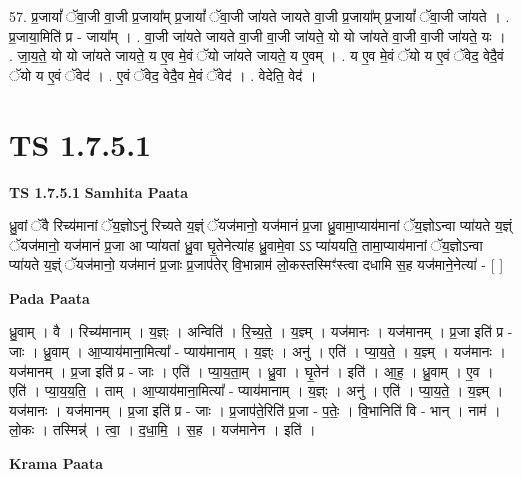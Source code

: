 \documentclass[17pt]{extarticle}
\begin{document}
57. प्र॒जायां᳚ ॅवा॒जी वा॒जी प्र॒जाया᳚म् प्र॒जायां᳚ ॅवा॒जी जा॑यते जायते वा॒जी प्र॒जाया᳚म् प्र॒जायां᳚ ॅवा॒जी जा॑यते । . प्र॒जाया॒मिति॑ प्र - जाया᳚म् । . वा॒जी जा॑यते जायते वा॒जी वा॒जी जा॑यते॒ यो यो जा॑यते वा॒जी वा॒जी जा॑यते॒ यः । . जा॒य॒ते॒ यो यो जा॑यते जायते॒ य ए॒व मे॒वं ॅयो जा॑यते जायते॒ य ए॒वम् । . य ए॒व मे॒वं ॅयो य ए॒वं ॅवेद॒ वेदै॒वं ॅयो य ए॒वं ॅवेद॑ । . ए॒वं ॅवेद॒ वेदै॒व मे॒वं ॅवेद॑ । . वेदेति॒ वेद॑ । \newline
\pagebreak
{}
\section*{ TS 1.7.5.1 }

\textbf{TS 1.7.5.1 } \newline
\textbf{Samhita Paata} \newline

ध्रु॒वां ॅवै रिच्य॑मानां ॅय॒ज्ञोऽनु॑ रिच्यते य॒ज्ञ्ं ॅयज॑मानो॒ यज॑मानं प्र॒जा ध्रु॒वामा॒प्याय॑मानां ॅय॒ज्ञोऽन्वा प्या॑यते य॒ज्ञ्ं ॅयज॑मानो॒ यज॑मानं प्र॒जा आ प्या॑यतां ध्रु॒वा घृ॒तेनेत्या॑ह ध्रु॒वामे॒वा ऽऽ प्या॑ययति॒ तामा॒प्याय॑मानां ॅय॒ज्ञोऽन्वा प्या॑यते य॒ज्ञ्ं ॅयज॑मानो॒ यज॑मानं प्र॒जाः प्र॒जाप॑तेर् वि॒भान्नाम॑ लो॒कस्तस्मिꣳ॑स्त्वा दधामि स॒ह यज॑माने॒नेत्या॑ - [ ] \newline

\textbf{Pada Paata} \newline

ध्रु॒वाम् । वै । रिच्य॑मानाम् । य॒ज्ञ्ः । अन्विति॑ । रि॒च्य॒ते॒ । य॒ज्ञ्म् । यज॑मानः । यज॑मानम् । प्र॒जा इति॑ प्र - जाः । ध्रु॒वाम् । आ॒प्याय॑माना॒मित्या᳚ - प्याय॑मानाम् । य॒ज्ञ्ः । अनु॑ । एति॑ । प्या॒य॒ते॒ । य॒ज्ञ्म् । यज॑मानः । यज॑मानम् । प्र॒जा इति॑ प्र - जाः । एति॑ । प्या॒य॒ता॒म् । ध्रु॒वा । घृ॒तेन॑ । इति॑ । आ॒ह॒ । ध्रु॒वाम् । ए॒व । एति॑ । प्या॒य॒य॒ति॒ । ताम् । आ॒प्याय॑माना॒मित्या᳚ - प्याय॑मानाम् । य॒ज्ञ्ः । अनु॑ । एति॑ । प्या॒य॒ते॒ । य॒ज्ञ्म् । यज॑मानः । यज॑मानम् । प्र॒जा इति॑ प्र - जाः । प्र॒जाप॑ते॒रिति॑ प्र॒जा - प॒तेः॒ । वि॒भानिति॑ वि - भान् । नाम॑ । लो॒कः । तस्मिन्न्॑ । त्वा॒ । द॒धा॒मि॒ । स॒ह । यज॑मानेन । इति॑ ।  \newline


\textbf{Krama Paata} \newline
\end{document}
